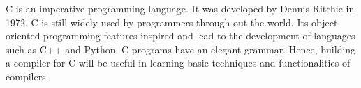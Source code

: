 C is an imperative programming language. It was developed by Dennis Ritchie in 1972. C is still widely used by programmers through out the world. Its object oriented programming features inspired and lead to the development of languages such as C++ and Python. C programs have an elegant grammar. Hence, building a compiler for C will be useful in learning basic techniques and functionalities of compilers.